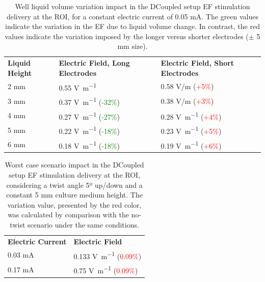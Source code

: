 \begin{table}
\caption{Well liquid volume variation impact in the DCoupled setup \acs{EF} stimulation delivery at the \acs{ROI}, for a constant electric current of 0.05 \si{\milli\ampere}. The green values indicate the variation in the \acs{EF} due to liquid volume change. In contrast, the red values indicate the variation imposed by the longer versus shorter electrodes ($\pm$ 5 \si{\milli\meter} size).}
\bigskip
\small
\centering
\begin{tabularx}{\textwidth}{lll} \toprule[0.25em]
 \textbf{Liquid Height} &  \textbf{Electric Field, Long Electrodes} &  \textbf{Electric Field, Short Electrodes} \\ \cmidrule(r){1-3}
2 \si{\milli\meter} & 0.55 \si{\volt\per\meter} & 0.58 V/m (\textcolor{red}{+5\%}) \\ 
3 \si{\milli\meter} & 0.37 \si{\volt\per\meter} (\textcolor{green}{-32\%}) & 0.38 V/m (\textcolor{red}{+3\%}) \\ 
4 \si{\milli\meter} & 0.27 \si{\volt\per\meter} (\textcolor{green}{-27\%}) & 0.28 \si{\volt\per\meter} (\textcolor{red}{+4\%}) \\ 
5 \si{\milli\meter} & 0.22 \si{\volt\per\meter} (\textcolor{green}{-18\%}) & 0.23 \si{\volt\per\meter} (\textcolor{red}{+5\%}) \\ 
6 \si{\milli\meter} & 0.18 \si{\volt\per\meter} (\textcolor{green}{-18\%}) & 0.19 \si{\volt\per\meter} (\textcolor{red}{+6\%}) \\ \bottomrule[0.25em] 
\end{tabularx}
\label{tab4d2}
\end{table}


\begin{table}
\caption{Worst case scenario impact in the DCoupled setup \acs{EF} stimulation delivery at the \acs{ROI}, considering a twist angle 5º up/down and a constant 5 \si{\milli\meter} culture medium height. The variation value, presented by the red color, was calculated by comparison with the no-twist scenario under the same conditions.}
\bigskip
\small
\centering
\begin{tabularx}{200px}{ll} \toprule[0.15em]
\textbf{Electric Current} &  \textbf{Electric Field}  \\ \cmidrule(r){1-2}
0.03 \si{\milli\ampere} & 0.133 \si{\volt\per\meter} (\textcolor{red}{0.09\%}) \\ 
0.17 \si{\milli\ampere} & 0.75 \si{\volt\per\meter} (\textcolor{red}{0.09\%})  \\ \bottomrule[0.15em] 
\end{tabularx}
\label{tab4d3}
\end{table}



